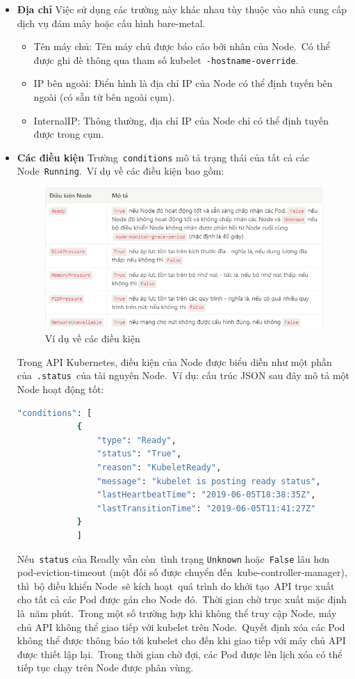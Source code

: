 \documentclass[12pt,a4paper]{report}
\begin{document}
	\begin{itemize}
		\item \textbf{Địa chỉ}
		\smallskip
		\subitem Việc sử dụng các trường này khác nhau tùy thuộc vào nhà cung cấp dịch vụ đám mây hoặc cấu hình bare-metal.
		\begin{itemize}
			\item Tên máy chủ: Tên máy chủ được báo cáo bởi nhân của Node. Có thể được ghi đè thông qua tham số kubelet \texttt{-hostname-override}.
			\item IP bên ngoài: Điển hình là địa chỉ IP của Node có thể định tuyến bên ngoài (có sẵn từ bên ngoài cụm).
			\item InternalIP: Thông thường, địa chỉ IP của Node chỉ có thể định tuyến được trong cụm.
		\end{itemize}
		\smallskip
		\item \textbf{Các điều kiện}
		\smallskip
		\subitem Trường \texttt{conditions} mô tả trạng thái của tất cả các Node \texttt{Running}. Ví dụ về các điều kiện bao gồm:
		\begin{figure}
			\centering
			\includegraphics[width=1\linewidth]{Pics/conditions}
			\caption{\label{fig:conditions}Ví dụ về các điều kiện}
			\label{fig:conditions}
		\end{figure}
		\smallskip
		\subitem Trong API Kubernetes, điều kiện của Node được biểu diễn như một phần của \texttt{.status} của tài nguyên Node. Ví dụ: cấu trúc JSON sau đây mô tả một Node hoạt động tốt:
		\smallskip
		\begin{lstlisting}[language=Bash]
			"conditions": [
			{
				"type": "Ready",
				"status": "True",
				"reason": "KubeletReady",
				"message": "kubelet is posting ready status",
				"lastHeartbeatTime": "2019-06-05T18:38:35Z",
				"lastTransitionTime": "2019-06-05T11:41:27Z"
			}
			]
		\end{lstlisting}
		\smallskip
		\subitem Nếu \texttt{status} của Readly vẫn còn tình trạng \texttt{Unknown} hoặc \texttt{False} lâu hơn pod-eviction-timeout (một đối số được chuyển đến kube-controller-manager), thì bộ điều khiển Node sẽ kích hoạt quá trình do khởi tạo API trục xuất cho tất cả các Pod được gán cho Node đó. Thời gian chờ trục xuất mặc định là năm phút. Trong một số trường hợp khi không thể truy cập Node, máy chủ API không thể giao tiếp với kubelet trên Node. Quyết định xóa các Pod không thể được thông báo tới kubelet cho đến khi giao tiếp với máy chủ API được thiết lập lại. Trong thời gian chờ đợi, các Pod được lên lịch xóa có thể tiếp tục chạy trên Node được phân vùng.

\end{itemize}
\end{document}
